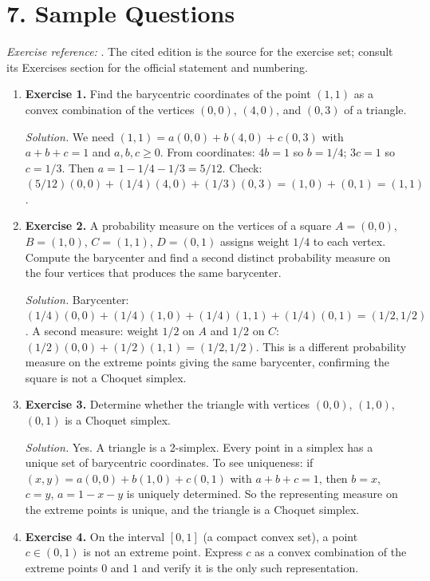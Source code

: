 \section*{7. Sample Questions}
\emph{Exercise reference:} \cite{choquet_theory_ref1}. The cited edition is the source for the exercise set; consult its Exercises section for the official statement and numbering.
\begin{enumerate}[leftmargin=*,itemsep=0.9em]

\item \textbf{Exercise 1.} Find the barycentric coordinates of the point $(1,1)$ as a convex combination of the vertices $(0,0)$, $(4,0)$, and $(0,3)$ of a triangle.

\emph{Solution.} We need $(1,1)=a(0,0)+b(4,0)+c(0,3)$ with $a+b+c=1$ and $a,b,c\ge 0$. From coordinates: $4b=1$ so $b=1/4$; $3c=1$ so $c=1/3$. Then $a=1-1/4-1/3=5/12$. Check: $(5/12)(0,0)+(1/4)(4,0)+(1/3)(0,3)=(1,0)+(0,1)=(1,1)$.

\item \textbf{Exercise 2.} A probability measure on the vertices of a square $A=(0,0)$, $B=(1,0)$, $C=(1,1)$, $D=(0,1)$ assigns weight $1/4$ to each vertex. Compute the barycenter and find a second distinct probability measure on the four vertices that produces the same barycenter.

\emph{Solution.} Barycenter: $(1/4)(0,0)+(1/4)(1,0)+(1/4)(1,1)+(1/4)(0,1)=(1/2,1/2)$. A second measure: weight $1/2$ on $A$ and $1/2$ on $C$: $(1/2)(0,0)+(1/2)(1,1)=(1/2,1/2)$. This is a different probability measure on the extreme points giving the same barycenter, confirming the square is not a Choquet simplex.

\item \textbf{Exercise 3.} Determine whether the triangle with vertices $(0,0)$, $(1,0)$, $(0,1)$ is a Choquet simplex.

\emph{Solution.} Yes. A triangle is a 2-simplex. Every point in a simplex has a unique set of barycentric coordinates. To see uniqueness: if $(x,y)=a(0,0)+b(1,0)+c(0,1)$ with $a+b+c=1$, then $b=x$, $c=y$, $a=1-x-y$ is uniquely determined. So the representing measure on the extreme points is unique, and the triangle is a Choquet simplex.

\item \textbf{Exercise 4.} On the interval $[0,1]$ (a compact convex set), a point $c\in(0,1)$ is not an extreme point. Express $c$ as a convex combination of the extreme points $0$ and $1$ and verify it is the only such representation.


\end{enumerate}
